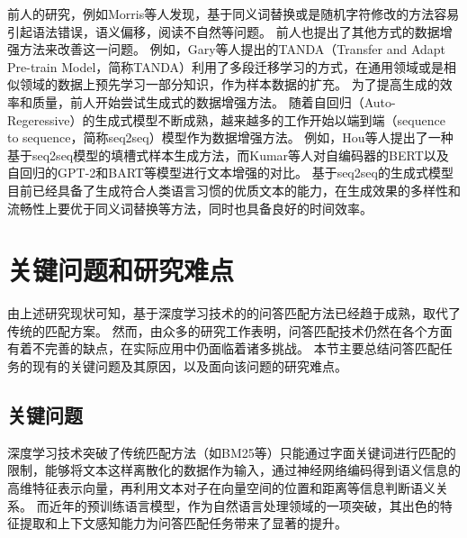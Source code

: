 前人的研究，例如Morris等人\cite{morris-etal-2020-reevaluating}发现，基于同义词替换或是随机字符修改的方法容易引起语法错误，语义偏移，阅读不自然等问题。
前人也提出了其他方式的数据增强方法来改善这一问题。
例如，Gary等人\cite{garg2020tanda}提出的TANDA（Transfer and Adapt Pre-train Model，简称TANDA）利用了多段迁移学习的方式，在通用领域或是相似领域的数据上预先学习一部分知识，作为样本数据的扩充。
为了提高生成的效率和质量，前人开始尝试生成式的数据增强方法。
随着自回归（Auto-Regeressive）的生成式模型不断成熟，越来越多的工作开始以端到端（sequence to sequence，简称seq2seq）模型作为数据增强方法。
例如，Hou等人\cite{hou-etal-2018-sequence}提出了一种基于seq2seq模型的填槽式样本生成方法，而Kumar等人\cite{kumar-etal-2020-data}对自编码器的BERT以及自回归的GPT-2\cite{radford2019language}和BART\cite{lewis2019bart}等模型进行文本增强的对比。
基于seq2seq的生成式模型目前已经具备了生成符合人类语言习惯的优质文本的能力，在生成效果的多样性和流畅性上要优于同义词替换等方法，同时也具备良好的时间效率。




\section{关键问题和研究难点}

由上述研究现状可知，基于深度学习技术的的问答匹配方法已经趋于成熟，取代了传统的匹配方案。
然而，由众多的研究工作表明，问答匹配技术仍然在各个方面有着不完善的缺点，在实际应用中仍面临着诸多挑战。
本节主要总结问答匹配任务的现有的关键问题及其原因，以及面向该问题的研究难点。

\subsection{关键问题}


深度学习技术突破了传统匹配方法（如BM25等）只能通过字面关键词进行匹配的限制，能够将文本这样离散化的数据作为输入，通过神经网络编码得到语义信息的高维特征表示向量，再利用文本对子在向量空间的位置和距离等信息判断语义关系。
而近年的预训练语言模型，作为自然语言处理领域的一项突破，其出色的特征提取和上下文感知能力为问答匹配任务带来了显著的提升。

